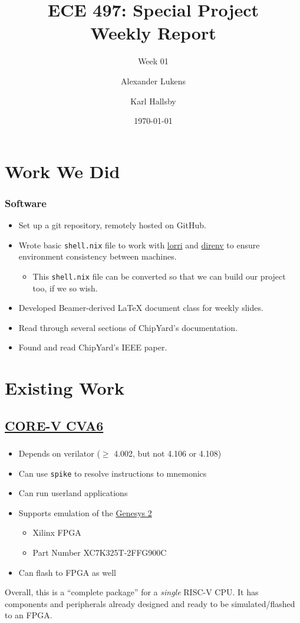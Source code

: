 \documentclass{weeklyslides}
\title[Weekly Report]{ECE 497: Special Project \\ Weekly Report}
\subtitle{Week 01}
\author{Alexander Lukens \and Karl Hallsby}
\institute{Illinois Institute of Technology}
\date{\today}
\begin{document}
\begin{frame}
  \titlepage{}
\end{frame}

\section{Work We Did}\label{sec:Work_We_Did}
\begin{frame}
  \frametitle{Software}
  \begin{itemize}
  \item Set up a git repository, remotely hosted on GitHub.
  \item Wrote basic \texttt{shell.nix} file to work with \href{https://github.com/target/lorri}{lorri} and \href{https://github.com/direnv/direnv}{direnv} to ensure environment consistency between machines.
    \begin{itemize}
    \item This \texttt{shell.nix} file can be converted so that
      we can build our project too, if we so wish.
    \end{itemize}
  \item Developed Beamer-derived \LaTeX{} document class for weekly slides.
  \item Read through several sections of ChipYard's documentation.
  \item Found and read ChipYard's IEEE paper.
  \end{itemize}
\end{frame}

\section{Existing Work}\label{sec:Existing_Work}
\subsection{\href{https://github.com/openhwgroup/cva6}{CORE-V CVA6}}\label{sec:CORE_V_CVA6}
\begin{frame}
  \frametitle{}
  \begin{itemize}
  \item Depends on verilator ($\geq$ 4.002, but not 4.106 or 4.108)
  \item Can use \texttt{spike} to resolve instructions to mnemonics
  \item Can run userland applications
  \item Supports emulation of the \href{https://reference.digilentinc.com/reference/programmable-logic/genesys-2/reference-manual}{Genesys 2}
    \begin{itemize}
    \item Xilinx FPGA
    \item Part Number XC7K325T-2FFG900C
    \end{itemize}
  \item Can flash to FPGA as well
  \end{itemize}

  Overall, this is a ``complete package'' for a \emph{single} RISC-V CPU.\@
  It has components and peripherals already designed and ready to be simulated/flashed to an FPGA.\@
\end{frame}
\end{document}
